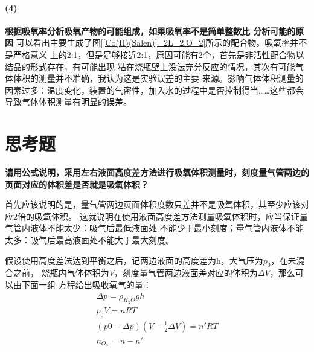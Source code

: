\documentclass[a4paper,zihao=5,UTF8]{ctexart}
\begin{document}
    \paragraph{(4)}\textbf{根据吸氧率分析吸氧产物的可能组成，如果吸氧率不是简单整数比
    分析可能的原因}
    可以看出主要生成了图\ref{[Co(II)(Salen)]_2L_2.O_2}所示的配合物。吸氧率并不是严格意义
    上的2:1，但是足够接近2:1，原因可能有2个，首先是非活性配合物以结晶的形式存在，有可能出现
    粘在烧瓶壁上没法充分反应的情况，其次有可能气体体积的测量并不准确，我认为这是实验误差的主要
    来源。影响气体体积测量的因素过多：温度变化，装置的气密性，加入水的过程中是否控制得当……这些都会
    导致气体体积测量有明显的误差。
    \section{思考题}
    \textbf{请用公式说明，采用左右液面高度差方法进行吸氧体积测量时，刻度量气管两边的
    页面对应的体积差是否就是吸氧体积？}
    \par 
    首先应该说明的是，量气管两边页面体积度数只差并不是吸氧体积，其至少应该对应2倍的吸氧体积。
    这就说明在使用液面高度差方法测量吸氧体积时，应当保证量气管内液体不能太少：吸气后最低液面处
    不能少于最小刻度；量气管内液体不能太多：吸气后最高液面处不能大于最大刻度。
    \par 
    假设使用高度差法达到平衡之后，记两边液面的高度差为h，大气压为$p_0$，在未混合之前，
    烧瓶内气体体积为$V$，刻度量气管两边液面差对应的体积为$\Delta V$，那么可以由下面一组
    方程给出吸收氧气的量：
    \begin{align}
        \Delta p = \rho_{H_2O}gh\\
        p_0V = nRT\\
        (p0 - \Delta p)(V - \frac{1}{2}\Delta V) = n'RT\\
        n_{O_2} = n - n'
    \end{align}
    
	
\end{document}
